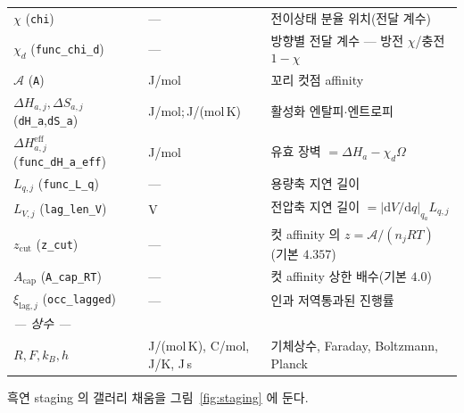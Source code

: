 \documentclass[11pt,a4paper]{article}
\newcommand{\dd}{\mathrm{d}}
\newcommand{\eff}{\mathrm{eff}}
\newcommand{\code}[1]{\texttt{#1}}
\begin{document}
\begin{longtable}{p{} p{} p{}}
$\chi$ (\code{chi}) & --- & 전이상태 분율 위치(전달 계수) \\
$\chi_d$ (\code{func\_chi\_d}) & --- & 방향별 전달 계수 — 방전 $\chi$/충전 $1-\chi$ \\
$\mathcal A$ (\code{A}) & J/mol & 꼬리 컷점 affinity \\
$\Delta H_{a,j},\Delta S_{a,j}$ (\code{dH\_a},\code{dS\_a}) & {\footnotesize J/mol;\,J/(mol\,K)} & 활성화 엔탈피$\cdot$엔트로피 \\
$\Delta H_{a,j}^\eff$ (\code{func\_dH\_a\_eff}) & J/mol & 유효 장벽 $=\Delta H_a-\chi_d\Omega$ \\
$L_{q,j}$ (\code{func\_L\_q}) & --- & 용량축 지연 길이 \\
$L_{V,j}$ (\code{lag\_len\_V}) & V & 전압축 지연 길이 $=|\dd V/\dd q|_{q_a}L_{q,j}$ \\
$z_\mathrm{cut}$ (\code{z\_cut}) & --- & 컷 affinity 의 $z=\mathcal A/(n_jRT)$(기본 $4.357$) \\
$A_\mathrm{cap}$ (\code{A\_cap\_RT}) & --- & 컷 affinity 상한 배수(기본 $4.0$) \\
$\xi_{\mathrm{lag},j}$ (\code{occ\_lagged}) & --- & 인과 저역통과된 진행률 \\
\multicolumn{3}{l}{\emph{— 상수 —}}\\
$R,F,k_B,h$ & {\footnotesize J/(mol\,K), C/mol, J/K, J\,s} & 기체상수, Faraday, Boltzmann, Planck \\
\bottomrule
\end{longtable}

흑연 staging 의 갤러리 채움을 그림~\ref{fig:staging} 에 둔다.
\end{document}

